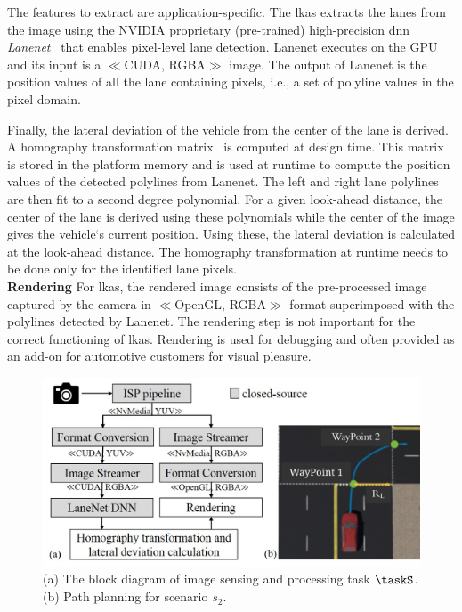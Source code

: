 The features to extract are application-specific. The \gls{lkas} extracts the lanes from the image using the NVIDIA proprietary (pre-trained) high-precision \gls{dnn} \textit{Lanenet}~\cite{wang2018lanenet} that enables pixel-level lane detection. 
Lanenet executes on the GPU and its input is a $\ll$CUDA, RGBA$\gg$ image. The output of Lanenet is the position values of all the lane containing pixels, i.e., a set of polyline values in the pixel domain.

Finally, the lateral deviation of the vehicle from the center of the lane is derived. A homography transformation matrix~\cite{hartley2003multiple} is computed at design time. This matrix is stored in the platform memory and is used at runtime to compute the position values of the detected polylines from Lanenet.
The left and right lane polylines are then fit to a second degree polynomial. For a given look-ahead distance,
the center of the lane is derived using these polynomials while the center of the image gives the vehicle`s current position. Using these, the lateral deviation is calculated at the look-ahead distance. The homography transformation at runtime needs to be done only for the identified lane pixels. 
\\[1ex]
\noindent\textbf{Rendering}
For \gls{lkas}, the rendered image consists of the pre-processed image captured by the camera in $\ll$OpenGL, RGBA$\gg$ format superimposed with the polylines detected by Lanenet. 
The rendering step is not important for the correct functioning of \gls{lkas}. 
Rendering is used for debugging and often provided as an add-on for automotive customers for visual pleasure. 
\begin{figure}[t]
    \centering
    \includegraphics[scale=0.5]{images/SnPP.jpg}
    \caption{(a) The block diagram of image sensing and processing task $\taskS$. (b) Path planning for scenario $s_2$.}
    \label{fig:ch5_SandPP}
\end{figure}

